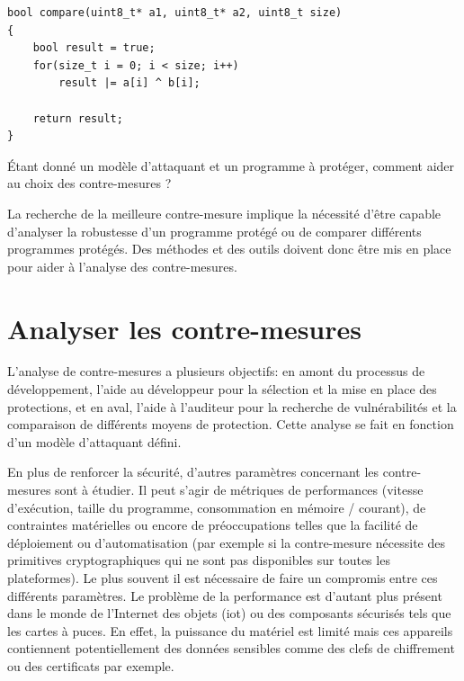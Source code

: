 \begin{lstlisting}  
bool compare(uint8_t* a1, uint8_t* a2, uint8_t size)
{
    bool result = true;
    for(size_t i = 0; i < size; i++) 
        result |= a[i] ^ b[i];

    return result;
}
\end{lstlisting} 

        \begin{probl}
            \label{prob:cm-selection}
            Étant donné un modèle d'attaquant et un programme à protéger, comment aider au choix des contre-mesures ?
        \end{probl}
        
        La recherche de la meilleure contre-mesure implique la nécessité d'être capable d'analyser la robustesse d'un programme protégé ou de comparer différents programmes protégés. Des méthodes et des outils doivent donc être mis en place pour aider à l'analyse des contre-mesures.

    \section{Analyser les contre-mesures}
    \label{sec:ctx.cm}

        L'analyse de contre-mesures a plusieurs objectifs: en amont du processus de développement, l'aide au développeur pour la sélection et la mise en place des protections, et en aval, l'aide à l'auditeur pour la recherche de vulnérabilités et la comparaison de différents moyens de protection. Cette analyse se fait en fonction d'un modèle d'attaquant défini.

        En plus de renforcer la sécurité, d'autres paramètres concernant les contre-mesures sont à étudier. Il peut s'agir de métriques de performances (vitesse d'exécution, taille du programme, consommation en mémoire / courant), de contraintes matérielles ou encore de préoccupations telles que la facilité de déploiement ou d'automatisation (par exemple si la contre-mesure nécessite des primitives cryptographiques qui ne sont pas disponibles sur toutes les plateformes).
        Le plus souvent il est nécessaire de faire un compromis entre ces différents paramètres. Le problème de la performance est d'autant plus présent dans le monde de l'Internet des objets (\gls{iot}) ou des composants sécurisés tels que les cartes à puces. En effet, la puissance du matériel est limité mais ces appareils contiennent potentiellement des données sensibles comme des clefs de chiffrement ou des certificats par exemple.

